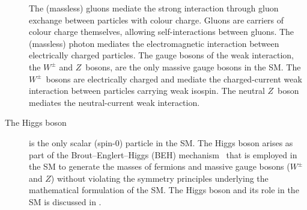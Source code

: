 \begin{description}
  The (massless) gluons mediate the strong interaction through gluon exchange
  between particles with colour charge. Gluons are carriers of colour charge
  themselves, allowing self-interactions between gluons. The (massless) photon
  mediates the electromagnetic interaction between electrically charged
  particles. The gauge bosons of the weak interaction, the $W^\pm$ and
  $Z$~bosons, are the only massive gauge bosons in the SM. The $W^\pm$~bosons
  are electrically charged and mediate the charged-current weak interaction
  between particles carrying weak isospin. The neutral $Z$~boson mediates the
  neutral-current weak interaction.

\item[The Higgs boson] is the only scalar (spin-$0$) particle in the SM. The
  Higgs boson arises as part of the Brout--Englert--Higgs (BEH)
  mechanism~\cite{Englert:1964et,Higgs:1964pj} that is employed in the SM to
  generate the masses of fermions and massive gauge bosons ($W^\pm$ and $Z$)
  without violating the symmetry principles underlying the mathematical
  formulation of the SM. The Higgs boson and its role in the SM is discussed in
  .

\end{description}

